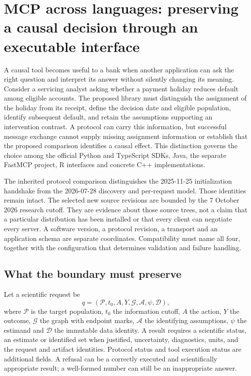 \section{MCP across languages: preserving a causal decision through an executable interface}
\label{sec:exec24-mcp-reuse}

A causal tool becomes useful to a bank when another application can ask the
right question and interpret its answer without silently changing its meaning.
Consider a servicing analyst asking whether a payment holiday reduces default
among eligible accounts. The proposed library must distinguish the assignment
of the holiday from its receipt, define the decision date and eligible
population, identify subsequent default, and retain the assumptions supporting
an intervention contrast. A protocol can carry this information, but successful
message exchange cannot supply missing assignment information or establish that
the proposed comparison identifies a causal effect. This distinction governs
the choice among the official Python and TypeScript SDKs, Java, the separate
FastMCP project, R interfaces and concrete C++ implementations.
\citep{exec24_mcp_contracts}

The inherited protocol comparison distinguishes the 2025-11-25 initialization
handshake from the 2026-07-28 discovery and per-request model. Those identities
remain intact. The selected new source revisions are bounded by the 7 October
2026 research cutoff. They are evidence about those source trees, not a claim
that a particular distribution has been installed or that every client can
negotiate every server. A software version, a protocol revision, a transport
and an application schema are separate coordinates. Compatibility must name
all four, together with the configuration that determines validation and
failure handling.~\citep{v12_mcp_legacy_lifecycle,v12_mcp_basic,
v12_mcp_versioning,exec24_mcp_contracts}

\subsection{What the boundary must preserve}

Let a scientific request be
\[
 q=(\mathcal P,t_0,A,Y,\mathcal G,\mathcal A,\psi,\mathcal D),
\]
where $\mathcal P$ is the target population, $t_0$ the information cutoff,
$A$ the action, $Y$ the outcome, $\mathcal G$ the graph with endpoint marks,
$\mathcal A$ the identifying assumptions, $\psi$ the estimand and $\mathcal D$
the immutable data identity. A result requires a scientific status, an
estimate or identified set when justified, uncertainty, diagnostics, units,
and the request and artifact identities. Protocol status and tool execution
status are additional fields. A refusal can be a correctly executed and
scientifically appropriate result; a well-formed number can still be an
inappropriate answer.~\citep{exec24_mcp_contracts}

